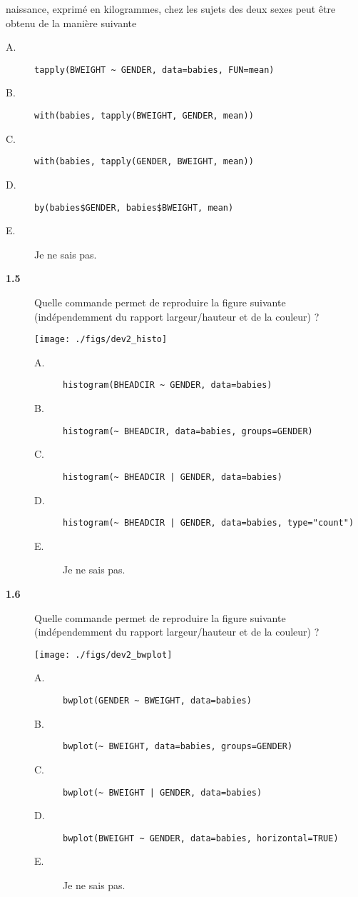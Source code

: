 \documentclass[11pt]{report}
\theoremstyle{definition}
\begin{document}
\begin{description}
  naissance, exprimé en kilogrammes, chez les sujets des deux sexes peut être
  obtenu de la manière suivante
  \begin{description}
  \item[A.] \verb|tapply(BWEIGHT ~ GENDER, data=babies, FUN=mean)|
  \item[B.] \verb|with(babies, tapply(BWEIGHT, GENDER, mean))|
  \item[C.] \verb|with(babies, tapply(GENDER, BWEIGHT, mean))|
  \item[D.] \verb|by(babies$GENDER, babies$BWEIGHT, mean)|
  \item[E.] Je ne sais pas.
  \end{description}  
\end{description}

\begin{description}
\item[\bf 1.5]  Quelle commande permet de
  reproduire la figure suivante (indépendemment du rapport largeur/hauteur
  et de la couleur) ?
\begin{center}
  \texttt{[image: ./figs/dev2\_histo]}
\end{center}
\begin{description}
\item[A.] \verb|histogram(BHEADCIR ~ GENDER, data=babies)|
\item[B.] \verb|histogram(~ BHEADCIR, data=babies, groups=GENDER)|
\item[C.] \verb+histogram(~ BHEADCIR | GENDER, data=babies)+
\item[D.] \verb+histogram(~ BHEADCIR | GENDER, data=babies, type="count")+
\item[E.] Je ne sais pas.
\end{description}

\item[\bf 1.6]  Quelle commande permet de
  reproduire la figure suivante (indépendemment du rapport largeur/hauteur
  et de la couleur) ?
\begin{center}
  \texttt{[image: ./figs/dev2\_bwplot]}
\end{center}
\begin{description}
\item[A.] \verb|bwplot(GENDER ~ BWEIGHT, data=babies)|
\item[B.] \verb|bwplot(~ BWEIGHT, data=babies, groups=GENDER)|
\item[C.] \verb+bwplot(~ BWEIGHT | GENDER, data=babies)+
\item[D.] \verb|bwplot(BWEIGHT ~ GENDER, data=babies, horizontal=TRUE)|
\item[E.] Je ne sais pas.
\end{description}
\end{description}
\end{document}
